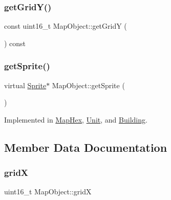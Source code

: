 \mbox{\label{class_map_object_a78d1316495dee5b12daca1fb2cc15f5c}} 
\subsubsection{\texorpdfstring{get\+Grid\+Y()}{getGridY()}}
{\footnotesize\ttfamily const uint16\+\_\+t Map\+Object\+::get\+GridY (\begin{DoxyParamCaption}{ }\end{DoxyParamCaption}) const\hspace{0.3cm}{\ttfamily [inline]}}

\mbox{\label{class_map_object_a3881fea264291ba07e0172d1cd3246cc}} 
\subsubsection{\texorpdfstring{get\+Sprite()}{getSprite()}}
{\footnotesize\ttfamily virtual \hyperlink{class_sprite}{Sprite}$\ast$ Map\+Object\+::get\+Sprite (\begin{DoxyParamCaption}{ }\end{DoxyParamCaption})\hspace{0.3cm}{\ttfamily [pure virtual]}}



Implemented in \hyperlink{class_map_hex_ac4ff66c1341e7b572fd90e8f0117ec68}{Map\+Hex}, \hyperlink{class_unit_ad45ef5ba23edfa7a1f598a65629eb3e8}{Unit}, and \hyperlink{class_building_a2ae5faae2dec5d1fda5538ea08228c0d}{Building}.



\subsection{Member Data Documentation}
\mbox{\label{class_map_object_a48d8e19188fd7ae1b74d2de47d546209}} 
\subsubsection{\texorpdfstring{gridX}{gridX}}
{\footnotesize\ttfamily uint16\+\_\+t Map\+Object\+::gridX\hspace{0.3cm}{\ttfamily [protected]}}

